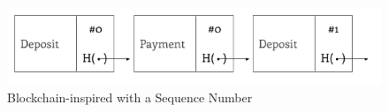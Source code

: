 \begin{figure}[ht]
\begin{center}
\includegraphics[width=15cm]{figures/consistency-2}
\end{center}
\caption{Blockchain-inspired with a Sequence Number}
\label{fig:consistency-2}
\end{figure}